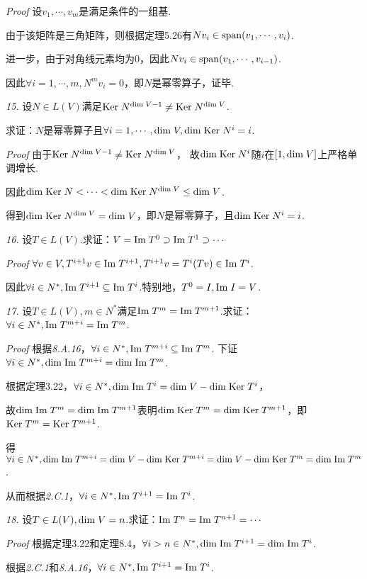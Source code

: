 \textit{Proof}
设\(v_1,\cdots,v_m\)是满足条件的一组基.

由于该矩阵是三角矩阵，则根据定理5.26有\(Nv_i \in \mathrm{span} (v_1,\cdots,v_i)\).

进一步，由于对角线元素均为\(0\)，因此\(Nv_i \in \mathrm{span} (v_1,\cdots,v_{i-1})\).

因此\(\forall i=1,\cdots,m,N^m v_i=0\)，即\(N\)是幂零算子，证毕.

\hspace*{\fill}

\textit{15.}
设\(N \in L(V)\)满足\(\mathrm{Ker \;} N^{\mathrm{dim \;} V-1} \ne \mathrm{Ker \;} N^{\mathrm{dim \;} V}\).

求证：\(N\)是幂零算子且\(\forall i=1,\cdots,\mathrm{dim \;} V,\mathrm{dim \;} \mathrm{Ker \;} N^i=i\).

\textit{Proof}
由于\(\mathrm{Ker \;} N^{\mathrm{dim \;} V-1} \ne \mathrm{Ker \;} N^{\mathrm{dim \;} V}\)，
故\(\mathrm{dim \;} \mathrm{Ker \;} N^i\)随\(i\)在\([1,\mathrm{dim \;} V]\)上严格单调增长.

因此\(\mathrm{dim \;} \mathrm{Ker \;} N<\cdots<\mathrm{dim \;} \mathrm{Ker \;} N^{\mathrm{dim \;} V} \leq \mathrm{dim \;} V\).

得到\(\mathrm{dim \;} \mathrm{Ker \;} N^{\mathrm{dim \;} V}=\mathrm{dim \;} V\)，即\(N\)是幂零算子，且\(\mathrm{dim \;} \mathrm{Ker \;} N^i=i\).

\hspace*{\fill}

\textit{16.}
设\(T \in L(V)\).求证：\(V=\mathrm{Im \;} T^0 \supset \mathrm{Im \;} T^1 \supset \cdots\)

\textit{Proof}
\(\forall v \in V,T^{i+1}v \in \mathrm{Im \;} T^{i+1},T^{i+1}v=T^i(Tv) \in \mathrm{Im \;} T^i\).

因此\(\forall i \in N^*,\mathrm{Im \;} T^{i+1} \subseteq \mathrm{Im \;} T^i\).特别地，\(T^0=I,\mathrm{Im \;} I=V\).

\hspace*{\fill}

\textit{17.}
设\(T \in L(V),m \in N^*\)满足\(\mathrm{Im \;} T^m=\mathrm{Im \;} T^{m+1}\).求证：\(\forall i \in N^*,\mathrm{Im \;} T^{m+i}=\mathrm{Im \;} T^m\).

\textit{Proof}
根据\textit{8.A.16}，\(\forall i \in N^*,\mathrm{Im \;} T^{m+i} \subseteq \mathrm{Im \;} T^m\).
下证\(\forall i \in N^*,\mathrm{dim \;} \mathrm{Im \;} T^{m+i}=\mathrm{dim \;} \mathrm{Im \;} T^m\).

根据定理3.22，\(\forall i \in N^*,\mathrm{dim \;} \mathrm{Im \;} T^i=\mathrm{dim \;} V-\mathrm{dim \;} \mathrm{Ker \;} T^i\)，

故\(\mathrm{dim \;} \mathrm{Im \;} T^m=\mathrm{dim \;} \mathrm{Im \;} T^{m+1}\)表明\(\mathrm{dim \;} \mathrm{Ker \;} T^m=\mathrm{dim \;} \mathrm{Ker \;} T^{m+1}\)，即\(\mathrm{Ker \;} T^m =\mathrm{Ker \;} T^{m+1}\).

得\(\forall i \in N^*,\mathrm{dim \;} \mathrm{Im \;} T^{m+i}=\mathrm{dim \;} V-\mathrm{dim \;} \mathrm{Ker \;} T^{m+i}=\mathrm{dim \;} V-\mathrm{dim \;} \mathrm{Ker \;} T^m=\mathrm{dim \;} \mathrm{Im \;} T^m\).

从而根据\textit{2.C.1}，\(\forall i \in N^*,\mathrm{Im \;} T^{i+1}=\mathrm{Im \;} T^i\).

\hspace*{\fill}

\textit{18.}
设\(T \in L(V),\mathrm{dim \;} V=n\).求证：\(\mathrm{Im \;} T^n=\mathrm{Im \;} T^{n+1}=\cdots\)

\textit{Proof}
根据定理3.22和定理8.4，\(\forall i>n \in N^*,\mathrm{dim \;} \mathrm{Im \;} T^{i+1}=\mathrm{dim \;} \mathrm{Im \;} T^i\).

根据\textit{2.C.1}和\textit{8.A.16}，\(\forall i \in N^*,\mathrm{Im \;} T^{i+1}=\mathrm{Im \;} T^i\).

